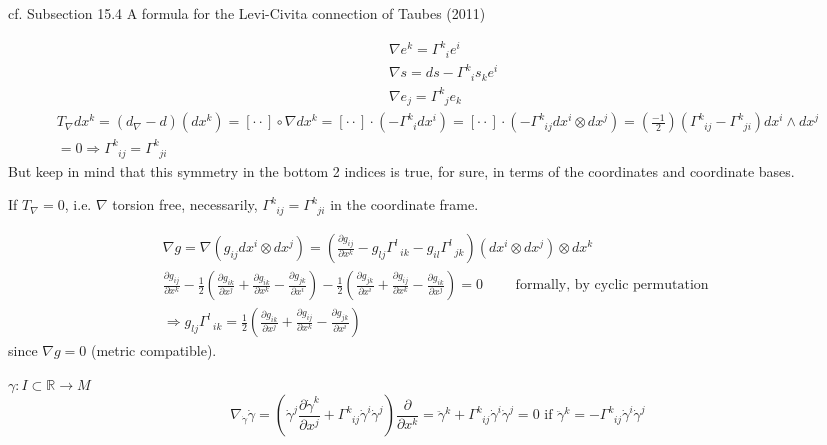 \documentclass[10pt, twoside]{amsart}
\begin{document}
\begin{multicols*}{2}
cf. Subsection 15.4 A formula for the Levi-Civita connection of  Taubes (2011) \cite{CTaubes2011}

\[
\begin{aligned}
  & \nabla e^k = \Gamma^k_{ \; \; i } e^i \\ 
  & \nabla s = ds - \Gamma^k_{ \; \; i }s_k e^i \\
  & \nabla e_j = \Gamma^k_{ \; \; j} e_k
\end{aligned}
\]
\[
\begin{gathered}
  T_{\nabla} dx^k = (d_{\nabla} - d)(dx^k) = [ \cdot \cdot ] \circ \nabla dx^k = [ \cdot \cdot ] \cdot (-\Gamma^k_{ \; \; i} dx^i ) = [ \cdot \cdot ] \cdot ( -\Gamma^k_{ \; \; ij} dx^i \otimes dx^j) = \left( \frac{-1}{2} \right) (\Gamma^k_{ \; \; ij} - \Gamma^k_{ \; \; ji} ) dx^i \wedge dx^j \\
   =0 \Longrightarrow \Gamma^k_{ \; \; ij} = \Gamma^k_{ \; \; ji }
\end{gathered}
\]
But keep in mind that this symmetry in the bottom 2 indices is true, for sure, in terms of the coordinates and coordinate bases.  

If $T_{\nabla}=0$, i.e. $\nabla$ torsion free, necessarily, $\Gamma^k_{ \; \; ij} = \Gamma^k_{ \; \; ji}$ in the coordinate frame.  

\[
\begin{gathered}
  \nabla g = \nabla ( g_{ij} dx^i \otimes dx^j) = \left( \frac{ \partial g_{ij} }{ \partial x^k} - g_{lj} \Gamma^l_{ \; \; ik} - g_{il} \Gamma^l_{ \; \; jk} \right)( dx^i \otimes dx^j) \otimes dx^k \\
 \frac{ \partial g_{ij} }{ \partial x^k} - \frac{1}{2} \left( \frac{ \partial g_{ik}}{ \partial x^j} + \frac{ \partial g_{ik} }{ \partial x^k} - \frac{ \partial g_{jk} }{ \partial x^i} \right) - \frac{1}{2} \left( \frac{ \partial g_{jk}}{ \partial x^i} + \frac{ \partial g_{ij} }{ \partial x^k} - \frac{ \partial g_{ik} }{ \partial x^j} \right) =0 \qquad \text{ formally, by cyclic permutation } \\ 
 \Longrightarrow g_{lj} \Gamma^l_{ \; \; ik} = \frac{1}{2} \left( \frac{ \partial g_{ik} }{ \partial x^j} + \frac{ \partial g_{ij} }{ \partial x^k} - \frac{ \partial g_{jk} }{ \partial x^i} \right)
\end{gathered}
\]
since $\nabla g=0$ (metric compatible).



$\gamma : I \subset \mathbb{R} \to M$
\[
\nabla_{\dot{\gamma}} \dot{\gamma} =  \left( \dot{\gamma}^j \frac{ \partial \dot{\gamma}^k }{ \partial x^j } + \Gamma^k_{ \; \; ij} \dot{\gamma}^i \dot{\gamma}^j \right) \frac{\partial }{ \partial x^k} = \ddot{\gamma}^k + \Gamma^k_{ \; \; ij} \dot{\gamma}^i \dot{\gamma}^j = 0 \text{ if } \ddot{\gamma}^k = -\Gamma^k_{ \; \; ij} \dot{\gamma}^i \dot{\gamma}^j
\]


\end{multicols*}
\end{document}
